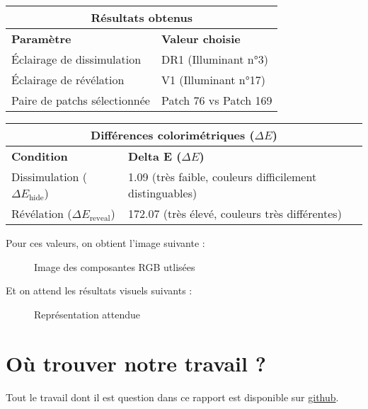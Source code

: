 \documentclass[12pt]{article}
\begin{document}
\begin{center}
\begin{tabular}{|p{5cm}|p{6cm}|}
    \hline
    \multicolumn{2}{|c|}{\textbf{Résultats obtenus}} \\
    \hline
    \textbf{Paramètre} & \textbf{Valeur choisie} \\
    \hline
    Éclairage de dissimulation & DR1 (Illuminant n°3) \\
    \hline
    Éclairage de révélation & V1 (Illuminant n°17) \\
    \hline
    Paire de patchs sélectionnée & Patch 76 vs Patch 169 \\
    \hline
\end{tabular}

\begin{tabular}{|p{5cm}|p{7cm}|}
    \hline
    \multicolumn{2}{|c|}{\textbf{Différences colorimétriques ($\Delta E$)}} \\
    \hline
    \textbf{Condition} & \textbf{Delta E ($\Delta E$)} \\
    \hline
    Dissimulation ($\Delta E_{\text{hide}}$) & 1.09 (très faible, couleurs difficilement distinguables) \\
    \hline
    Révélation ($\Delta E_{\text{reveal}}$) & 172.07 (très élevé, couleurs très différentes) \\
    \hline
\end{tabular}
\end{center}

\vspace{0.5cm}

\clearpage

Pour ces valeurs, on obtient l'image suivante :

\begin{figure}[H]
    \centering
    \caption{Image des composantes RGB utlisées}
\end{figure}

\clearpage

Et on attend les résultats visuels suivants :

\begin{figure}[H]
    \centering
    \caption{Représentation attendue}
\end{figure}

\clearpage

\section{Où trouver notre travail ?}

Tout le travail dont il est question dans ce rapport est disponible sur \href{https://github.com/antoinedenovembre/colorimetry_project_2}{github}.
\end{document}
